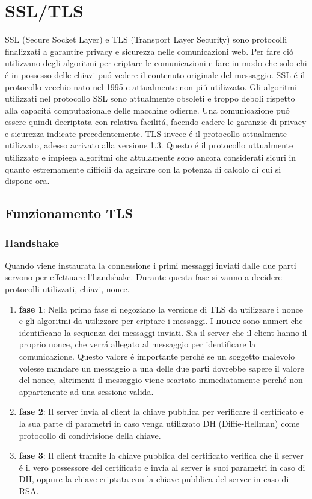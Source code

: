 \section{SSL/TLS}
\cite{tls}SSL (Secure Socket Layer) e TLS (Transport Layer Security) sono protocolli finalizzati a garantire privacy e sicurezza nelle comunicazioni web. Per fare ció utilizzano degli algoritmi per criptare le comunicazioni e fare in modo che solo chi é in possesso delle chiavi puó vedere il contenuto originale del messaggio. SSL é il protocollo vecchio nato nel 1995 e attualmente non piú utilizzato. Gli algoritmi utilizzati nel protocollo SSL sono attualmente obsoleti e troppo deboli rispetto alla capacitá computazionale delle macchine odierne. Una comunicazione puó essere quindi decriptata con relativa facilitá, facendo cadere le garanzie di privacy e sicurezza indicate precedentemente. TLS invece é il protocollo attualmente utilizzato, adesso arrivato alla versione 1.3. Questo é il protocollo uttualmente utilizzato e impiega algoritmi che attulamente sono ancora considerati sicuri in quanto estremamente difficili da aggirare con la potenza di calcolo di cui si dispone ora.
\subsection{Funzionamento TLS}
\subsubsection{Handshake}
Quando viene instaurata la connessione i primi messaggi inviati dalle due parti servono per effettuare l'handshake. Durante questa fase si vanno a decidere protocolli utilizzati, chiavi, nonce.
\begin{enumerate}
  \item \textbf{fase 1}: Nella prima fase si negoziano la versione di TLS da utilizzare i nonce e gli algoritmi da utilizzare per criptare i messaggi. I \textbf{nonce} sono numeri che identificano la sequenza dei messaggi inviati. Sia il server che il client hanno il proprio nonce, che verrá allegato al messaggio per identificare la comunicazione. Questo valore é importante perché se un soggetto malevolo volesse mandare un messaggio a una delle due parti dovrebbe sapere il valore del nonce, altrimenti il messaggio viene scartato immediatamente perché non appartenente ad una sessione valida.
  \item \textbf{fase 2}: Il server invia al client la chiave pubblica per verificare il certificato e la sua parte di parametri in caso venga utilizzato DH (Diffie-Hellman) come protocollo di condivisione della chiave.
  \item \textbf{fase 3}: Il client tramite la chiave pubblica del certificato verifica che il server é il vero possessore del certificato e invia al server is suoi parametri in caso di DH, oppure la chiave criptata con la chiave pubblica del server in caso di RSA.
\end{enumerate}

